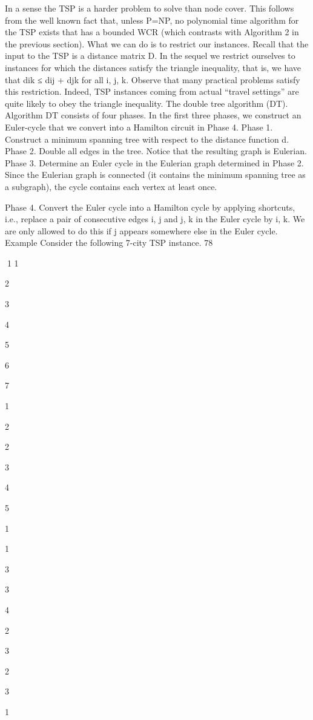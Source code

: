 In a sense the TSP is a harder problem to solve than node cover. This follows from the well known fact
that, unless P=NP, no polynomial time algorithm for the TSP exists that has a bounded WCR (which
contrasts with Algorithm 2 in the previous section).
What we can do is to restrict our instances. Recall that the input to the TSP is a distance matrix D. In
the sequel we restrict ourselves to instances for which the distances satisfy the triangle inequality, that is,
we have that dik ≤ dij + djk for all i, j, k. Observe that many practical problems satisfy this restriction.
Indeed, TSP instances coming from actual “travel settings” are quite likely to obey the triangle inequality.
The double tree algorithm (DT).
Algorithm DT consists of four phases. In the first three phases, we construct an Euler-cycle that we
convert into a Hamilton circuit in Phase 4.
Phase 1. Construct a minimum spanning tree with respect to the distance function d.
Phase 2. Double all edges in the tree. Notice that the resulting graph is Eulerian.
Phase 3. Determine an Euler cycle in the Eulerian graph determined in Phase 2. Since the Eulerian
graph is connected (it contains the minimum spanning tree as a subgraph), the cycle contains each vertex
at least once.

Phase 4. Convert the Euler cycle into a Hamilton cycle by applying shortcuts, i.e., replace a pair of
consecutive edges {i, j} and {j, k} in the Euler cycle by {i, k}. We are only allowed to do this if j appears
somewhere else in the Euler cycle.
Example Consider the following 7-city TSP instance.
78

1
1

2

3

4

5

6

7

1

2

2

3

4

5

1

1

3

3

4

2

3

2

3

1

